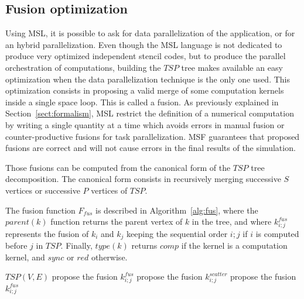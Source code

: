 \subsection{Fusion optimization}
\label{sect:fusion}

Using MSL, it is possible to ask for data parallelization of the application, or for an hybrid parallelization. Even though the MSL language is not dedicated to produce very optimized independent stencil codes, but to produce the parallel orchestration of computations, building the $TSP$ tree makes available an easy optimization when the data parallelization technique is the only one used. 
This optimization consists in proposing a valid merge of some computation kernels inside a single space loop. This is called a fusion. As previously explained in Section~\ref{sect:formalism}, MSL restrict the definition of a numerical computation by writing a single quantity at a time which avoids errors in manual fusion or counter-productive fusions for task parallelization. MSF guarantees that proposed fusions are correct and will not cause errors in the final results of the simulation.

Those fusions can be computed from the canonical form of the $TSP$ tree decomposition. The canonical form consists in recursively merging successive $S$ vertices or successive $P$ vertices of $TSP$.

The fusion function $F_{fus}$ is described in Algorithm~\ref{alg:fus}, where the $parent(k)$ function returns the parent vertex of $k$ in the tree, and where $k_{i;j}^{fus}$ represents the fusion of $k_i$ and $k_j$ keeping the sequential order $i;j$ if $i$ is computed before $j$ in $TSP$. Finally, $type(k)$ returns $comp$ if the kernel is a computation kernel, and $sync$  or $red$ otherwise.

\begin{algorithm}
\caption{$F_{fus}$}
\label{alg:fus}
\begin{algorithmic}[1]
 {$TSP(V,E)$}
\State propose the fusion $k_{i;j}^{fus}$
\Else
{}
\State propose the fusion $k_{i;j}^{scatter}$
\EndIf
\EndIf
{}
\State propose the fusion $k_{i;j}^{fus}$
\EndIf
\EndIf
\EndIf
\EndIf
\EndFor
\EndProcedure
\end{algorithmic}
\end{algorithm}

